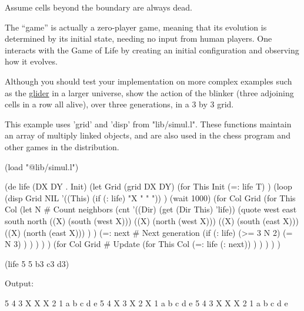 Assume cells beyond the boundary are always dead.

The ``game'' is actually a zero-player game, meaning that its evolution
is determined by its initial state, needing no input from human players.
One interacts with the Game of Life by creating an initial configuration
and observing how it evolves.

Although you should test your implementation on more complex examples
such as the
\href{http://en.wikipedia.org/wiki/Conway\%27s\_Game\_of\_Life\#Examples\_of\_patterns}{glider}
in a larger universe, show the action of the blinker (three adjoining
cells in a row all alive), over three generations, in a 3 by 3 grid.



\begin{wideverbatim}

This example uses 'grid' and 'disp' from "lib/simul.l". These functions
maintain an array of multiply linked objects, and are also used in the chess
program and other games in the distribution.

(load "@lib/simul.l")
 
(de life (DX DY . Init)
   (let Grid (grid DX DY)
      (for This Init
         (=: life T) )
      (loop
         (disp Grid NIL
            '((This) (if (: life) "X " "  ")) )
         (wait 1000)
         (for Col Grid
            (for This Col
               (let N  # Count neighbors
                  (cnt
                     '((Dir) (get (Dir This) 'life))
                     (quote
                        west east south north
                        ((X) (south (west X)))
                        ((X) (north (west X)))
                        ((X) (south (east X)))
                        ((X) (north (east X))) ) )
                  (=: next  # Next generation
                     (if (: life)
                        (>= 3 N 2)
                        (= N 3) ) ) ) ) )
         (for Col Grid  # Update
            (for This Col
               (=: life (: next)) ) ) ) ) )
 
(life 5 5  b3 c3 d3)

\end{wideverbatim}

\begin{wideverbatim}
Output:

 5
 4
 3   X X X
 2
 1
   a b c d e
 5
 4     X
 3     X
 2     X
 1
   a b c d e
 5
 4
 3   X X X
 2
 1
   a b c d e

\end{wideverbatim}

